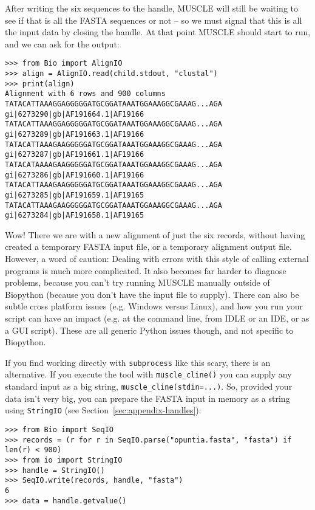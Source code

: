 After writing the six sequences to the handle, MUSCLE will still be waiting
to see if that is all the FASTA sequences or not -- so we must signal that
this is all the input data by closing the handle. At that point MUSCLE should
start to run, and we can ask for the output:

\begin{verbatim}
>>> from Bio import AlignIO
>>> align = AlignIO.read(child.stdout, "clustal")
>>> print(align)
Alignment with 6 rows and 900 columns
TATACATTAAAGGAGGGGGATGCGGATAAATGGAAAGGCGAAAG...AGA gi|6273290|gb|AF191664.1|AF19166
TATACATTAAAGGAGGGGGATGCGGATAAATGGAAAGGCGAAAG...AGA gi|6273289|gb|AF191663.1|AF19166
TATACATTAAAGAAGGGGGATGCGGATAAATGGAAAGGCGAAAG...AGA gi|6273287|gb|AF191661.1|AF19166
TATACATAAAAGAAGGGGGATGCGGATAAATGGAAAGGCGAAAG...AGA gi|6273286|gb|AF191660.1|AF19166
TATACATTAAAGAAGGGGGATGCGGATAAATGGAAAGGCGAAAG...AGA gi|6273285|gb|AF191659.1|AF19165
TATACATTAAAGAAGGGGGATGCGGATAAATGGAAAGGCGAAAG...AGA gi|6273284|gb|AF191658.1|AF19165
\end{verbatim}

Wow! There we are with a new alignment of just the six records, without having created
a temporary FASTA input file, or a temporary alignment output file. However, a word of
caution: Dealing with errors with this style of calling external programs is much more
complicated.
It also becomes far harder to diagnose problems, because you can't try running MUSCLE
manually outside of Biopython (because you don't have the input file to supply).
There can also be subtle cross platform issues (e.g. Windows versus Linux), and how
you run your script can have an impact (e.g. at the command line, from IDLE or an
IDE, or as a GUI script). These are all generic Python issues though, and not
specific to Biopython.

If you find working directly with \texttt{subprocess} like this scary, there is an
alternative. If you execute the tool with \texttt{muscle\_cline()} you can supply
any standard input as a big string, \texttt{muscle\_cline(stdin=...)}. So,
provided your data isn't very big, you can prepare the FASTA input in memory as
a string using \texttt{StringIO} (see Section~\ref{sec:appendix-handles}):

\begin{verbatim}
>>> from Bio import SeqIO
>>> records = (r for r in SeqIO.parse("opuntia.fasta", "fasta") if len(r) < 900)
>>> from io import StringIO
>>> handle = StringIO()
>>> SeqIO.write(records, handle, "fasta")
6
>>> data = handle.getvalue()
\end{verbatim}

